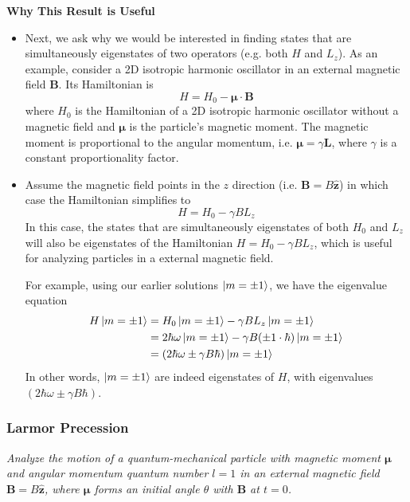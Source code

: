 \documentclass[11pt, a4paper]{article}
\renewcommand{\vec}[1]{\bm{#1}} %
\newcommand{\uvec}[1]{\hat{\vec{#1}}} %
\begin{document}
\textbf{Why This Result is Useful}\\
\begin{itemize}
	\item Next, we ask why we would be interested in finding states that are simultaneously eigenstates of two operators (e.g. both $ H $ and $ L_{z} $). As an example, consider a 2D isotropic harmonic oscillator in an external magnetic field $ \vec{B} $. Its Hamiltonian is
	\begin{equation*}
		H = H_{0} - \vec{\mu} \cdot \vec{B}
	\end{equation*}
	where $ H_{0} $ is the Hamiltonian of a 2D isotropic harmonic oscillator without a magnetic field and $ \vec{\mu} $ is the particle's magnetic moment. The magnetic moment is proportional to the angular momentum, i.e. $ \vec{\mu} = \gamma \vec{L} $, where $ \gamma $ is a constant proportionality factor.
	
	\item Assume the magnetic field points in the $ z $ direction (i.e. $ \vec{B} = B \uvec{z} $) in which case the Hamiltonian simplifies to
	\begin{equation*}
		H = H_{0} - \gamma B L_{z}
	\end{equation*}
	In this case, the states that are simultaneously eigenstates of both $ H_{0} $ and $ L_{z} $ will also be eigenstates of the Hamiltonian $ H = H_{0} - \gamma B L_{z}$, which is useful for analyzing particles in  a external magnetic field. 
	
	For example, using our earlier solutions $ \ket{m = \pm 1} $, we have the eigenvalue equation
	\begin{align*}
		H \ket{m = \pm 1} &= H_{0}\ket{m = \pm 1} - \gamma B L_{z} \ket{m = \pm 1} \\
		& = 2\hbar \omega \ket{m = \pm 1} - \gamma B (\pm 1 \cdot \hbar)\ket{m = \pm 1} \\
		&= (2\hbar \omega \pm \gamma B\hbar)\ket{m = \pm 1}
	\end{align*}
	In other words, $ \ket{m = \pm 1} $ are indeed eigenstates of $ H $, with eigenvalues $ (2\hbar \omega \pm \gamma B\hbar) $.
\end{itemize}


\subsubsection{Larmor Precession}
\textit{Analyze the motion of a quantum-mechanical particle with magnetic moment $ \vec{\mu} $ and angular momentum quantum number $ l = 1 $ in an external magnetic field $ \vec{B} = B\uvec{z} $, where $ \vec{\mu} $ forms an initial angle $ \theta $ with $ \vec{B} $ at $ t = 0 $.}
\end{document}

